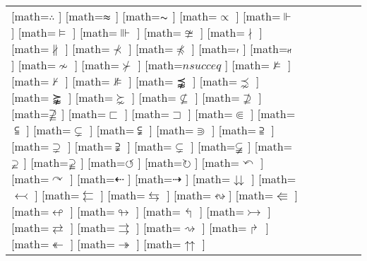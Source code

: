 \documentclass{unittest}
\begin{document}
\begin{tabular}{ll|ll|ll}
\makemath{∴}[math=$\therefore$     ]
\makemath{}[math=$\thickapprox$   ]
\makemath{}[math=$\thicksim$      ]
\makemath{}[math=$\varpropto$     ]
\makemath{⊩}[math=$\Vdash$         ]
\makemath{⊨}[math=$\vDash$         ]
\makemath{⊪}[math=$\Vvdash$        ]
\midrule%
\makemath{≇}[math=$\ncong$          ]
\makemath{∤}[math=$\nmid$           ]
\makemath{∦}[math=$\nparallel$      ]
\makemath{⊀}[math=$\nprec$          ]
\makemath{}[math=$\npreceq$        ]
\makemath{}[math=$\nshortmid$      ]
\makemath{}[math=$\nshortparallel$ ]
\makemath{≁}[math=$\nsim$           ]
\makemath{⊁}[math=$\nsucc$          ]
\makemath{}[math=$nsucceq$         ]
\makemath{⊭}[math=$\nvDash$         ]
\makemath{⊬}[math=$\nvdash$         ]
\makemath{⊯}[math=$\nVDash$         ]
\makemath{⪹}[math=$\precnapprox$    ]
\makemath{⋨}[math=$\precnsim$       ]
\makemath{⪺}[math=$\succnapprox$    ]
\makemath{⋩}[math=$\succnsim$       ]
\midrule%
\makemath{⊈}[math=$\nsubseteq$     ]
\makemath{⊉}[math=$\nsupseteq$     ]
\makemath{}[math=$\nsupseteqq$    ]
\makemath{⊏}[math=$\sqsubset$      ]
\makemath{⊐}[math=$\sqsupset$      ]
\makemath{⋐}[math=$\Subset$        ]
\makemath{⫅}[math=$\subseteqq$     ]
\makemath{⊊}[math=$\subsetneq$     ]
\makemath{⫋}[math=$\subsetneqq$    ]
\makemath{⋑}[math=$\Supset$        ]
\makemath{⫆}[math=$\supseteqq$     ]
\makemath{⊋}[math=$\supsetneq$     ]
\makemath{⫌}[math=$\supsetneqq$    ]
\makemath{}[math=$\varsubsetneq$  ]
\makemath{}[math=$\varsubsetneqq$ ]
\makemath{}[math=$\varsupsetneq$  ]
\makemath{}[math=$\varsupsetneqq$ ]
\midrule%
\makemath{⟲}[math=$\circlearrowleft$    ]
\makemath{⟳}[math=$\circlearrowright$   ]
\makemath{↶}[math=$\curvearrowleft$     ]
\makemath{↷}[math=$\curvearrowright$    ]
\makemath{⇠}[math=$\dashleftarrow$      ]
\makemath{⇢}[math=$\dashrightarrow$     ]
\makemath{⇊}[math=$\downdownarrows$     ]
\makemath{↢}[math=$\leftarrowtail$      ]
\makemath{⇇}[math=$\leftleftarrows$     ]
\makemath{⇆}[math=$\leftrightarrows$    ]
\makemath{↭}[math=$\leftrightsquigarrow$]
\makemath{⇚}[math=$\Lleftarrow$         ]
\makemath{↫}[math=$\looparrowleft$      ]
\makemath{↬}[math=$\looparrowright$     ]
\makemath{↰}[math=$\Lsh$                ]
\makemath{↣}[math=$\rightarrowtail$     ]
\makemath{⇄}[math=$\rightleftarrows$    ]
\makemath{⇒}[math=$\rightrightarrows$   ]
\makemath{⇝}[math=$\rightsquigarrow$    ]
\makemath{↱}[math=$\Rsh$                ]
\makemath{↞}[math=$\twoheadleftarrow$   ]
\makemath{↠}[math=$\twoheadrightarrow$  ]
\makemath{⇈}[math=$\upuparrows$         ]


\bottomrule
\end{tabular}
\end{document}
